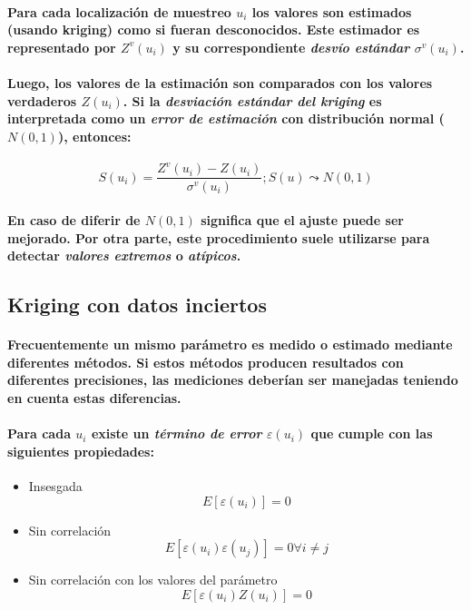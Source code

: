 \paragraph{
Para cada localización de muestreo $u_i$ los valores son estimados (usando kriging) como si fueran desconocidos. Este estimador es representado por $Z^v(u_i)$ y su correspondiente \emph{desvío estándar} $\sigma^v(u_i)$.
}
\paragraph{
Luego, los valores de la estimación son comparados con los valores verdaderos $Z(u_i)$. Si la \emph{desviación estándar del kriging} es interpretada como un \emph{error de estimación} con distribución normal ($N(0,1)$), entonces:
}
\begin{equation}
S(u_i) = \frac{Z^v(u_i) - Z(u_i)}{\sigma^v(u_i)} ; S(u) \leadsto N(0,1)
\end{equation}
\paragraph{
En caso de diferir de $N(0,1)$ significa que el ajuste puede ser mejorado. Por otra parte, este procedimiento suele utilizarse para detectar \emph{valores extremos} o \emph{atípicos}.
}


\subsection{Kriging con datos inciertos}
\paragraph{
Frecuentemente un mismo parámetro es medido o estimado mediante diferentes métodos. Si estos métodos producen resultados con diferentes precisiones, las mediciones deberían ser manejadas teniendo en cuenta estas diferencias.
}
\paragraph{
Para cada $u_i$ existe un \emph{término de error} $\varepsilon(u_i)$ que cumple con las siguientes propiedades:
}
\begin{itemize}
\item Insesgada
\begin{equation}
E[\varepsilon(u_i)] = 0
\end{equation}
\item Sin correlación
\begin{equation}
E[\varepsilon(u_i)\varepsilon(u_j)] = 0 \forall i \not= j
\end{equation}
\item Sin correlación con los valores del parámetro
\begin{equation}
E[\varepsilon(u_i)Z(u_i)] = 0
\end{equation}
\end{itemize}
